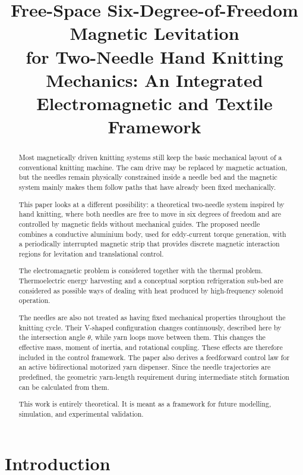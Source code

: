 \documentclass[12pt, a4paper]{article}
\title{\textbf{Free-Space Six-Degree-of-Freedom Magnetic Levitation\\
for Two-Needle Hand Knitting Mechanics: An Integrated Electromagnetic and Textile Framework}}
\date{}
\begin{document}
\maketitle

\begin{abstract}

Most magnetically driven knitting systems still keep the basic mechanical layout of a conventional knitting machine. The cam drive may be replaced by magnetic actuation, but the needles remain physically constrained inside a needle bed and the magnetic system mainly makes them follow paths that have already been fixed mechanically.

This paper looks at a different possibility: a theoretical two-needle system inspired by hand knitting, where both needles are free to move in six degrees of freedom and are controlled by magnetic fields without mechanical guides. The proposed needle combines a conductive aluminium body, used for eddy-current torque generation, with a periodically interrupted magnetic strip that provides discrete magnetic interaction regions for levitation and translational control.

The electromagnetic problem is considered together with the thermal problem. Thermoelectric energy harvesting and a conceptual sorption refrigeration sub-bed are considered as possible ways of dealing with heat produced by high-frequency solenoid operation.

The needles are also not treated as having fixed mechanical properties throughout the knitting cycle. Their V-shaped configuration changes continuously, described here by the intersection angle $\theta$, while yarn loops move between them. This changes the effective mass, moment of inertia, and rotational coupling. These effects are therefore included in the control framework. The paper also derives a feedforward control law for an active bidirectional motorized yarn dispenser. Since the needle trajectories are predefined, the geometric yarn-length requirement during intermediate stitch formation can be calculated from them.

This work is entirely theoretical. It is meant as a framework for future modelling, simulation, and experimental validation.

\end{abstract}

\section{Introduction}
\end{document}
